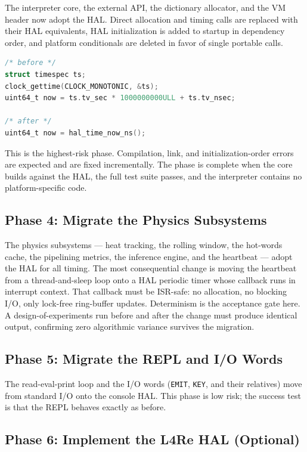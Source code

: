 The interpreter core, the external API, the dictionary allocator, and the VM
header now adopt the HAL. Direct allocation and timing calls are replaced with
their HAL equivalents, HAL initialization is added to startup in dependency
order, and platform conditionals are deleted in favor of single portable calls.

\begin{lstlisting}[language=C]
/* before */
struct timespec ts;
clock_gettime(CLOCK_MONOTONIC, &ts);
uint64_t now = ts.tv_sec * 1000000000ULL + ts.tv_nsec;

/* after */
uint64_t now = hal_time_now_ns();
\end{lstlisting}

This is the highest-risk phase. Compilation, link, and initialization-order
errors are expected and are fixed incrementally. The phase is complete when the
core builds against the HAL, the full test suite passes, and the interpreter
contains no platform-specific code.

\subsection{Phase 4: Migrate the Physics Subsystems}

The physics subsystems --- heat tracking, the rolling window, the hot-words
cache, the pipelining metrics, the inference engine, and the heartbeat --- adopt
the HAL for all timing. The most consequential change is moving the heartbeat
from a thread-and-sleep loop onto a HAL periodic timer whose callback runs in
interrupt context. That callback must be ISR-safe: no allocation, no blocking
I/O, only lock-free ring-buffer updates. Determinism is the acceptance gate here.
A design-of-experiments run before and after the change must produce identical
output, confirming zero algorithmic variance survives the migration.

\subsection{Phase 5: Migrate the REPL and I/O Words}

The read-eval-print loop and the I/O words (\texttt{EMIT}, \texttt{KEY}, and
their relatives) move from standard I/O onto the console HAL. This phase is low
risk; the success test is that the REPL behaves exactly as before.

\subsection{Phase 6: Implement the L4Re HAL (Optional)}

